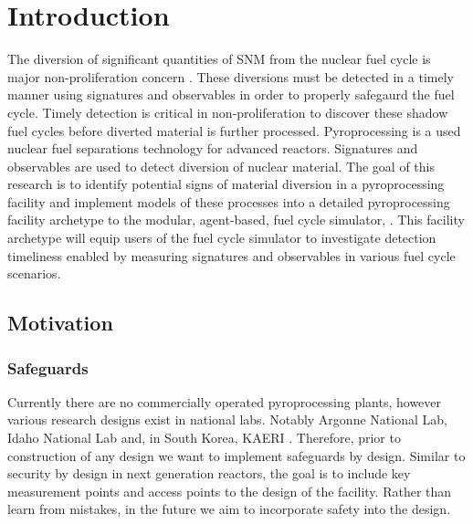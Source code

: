 \chapter[Introduction]{Introduction}
The diversion of significant quantities of \gls{SNM} from the nuclear fuel cycle is major non-proliferation 
concern \cite{noauthor_serving_2017}. These diversions must be detected in a timely manner using signatures and observables in 
order to properly safegaurd the fuel cycle. Timely detection is critical in non-proliferation to discover these shadow fuel cycles
before diverted material is further processed. Pyroprocessing is a used nuclear fuel separations technology for advanced reactors. 
Signatures and observables are used to detect diversion of nuclear material.
The goal of this research is to identify potential signs of material diversion in a pyroprocessing facility and implement models 
of these processes into a detailed pyroprocessing facility archetype to the modular, agent-based, fuel cycle simulator, \Cyclus \cite{huff_fundamental_2016}. This facility archetype will equip users of the \Cyclus fuel cycle simulator to investigate 
detection timeliness enabled by measuring signatures and observables in various fuel cycle scenarios.
\section{Motivation}
\subsection{Safeguards}
Currently there are no commercially operated pyroprocessing plants, however various research designs exist in national labs.
Notably Argonne National Lab, Idaho National Lab and, in South Korea, KAERI \cite{michael_f._simpson_developments_2012, lee_advanced, frigo_conceptual_2003}. 
Therefore, prior to construction of any design we 
want to implement safeguards by design. Similar to security by design in next generation reactors, the goal is to include key measurement 
points and access points to the design of the facility. Rather than learn from mistakes, in the future we aim to incorporate safety 
into the design.

